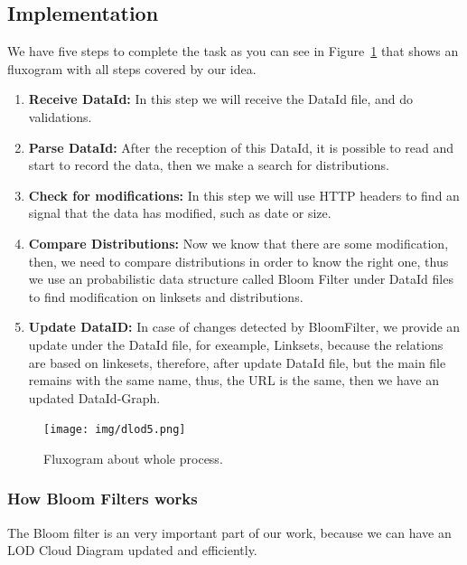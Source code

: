 \documentclass{iosart2c}
\begin{document}
\subsection{Implementation}
We have five steps to complete the task as you can see in Figure~\ref{fig:idea2} that shows an fluxogram with all steps covered by our idea.

\begin{enumerate}
\item \textbf{Receive DataId:} In this step we will receive the DataId file, and do validations.
\item \textbf{Parse DataId:} After the reception of this DataId, it is possible to read and start to record the data, then we make a search for distributions.
\item \textbf{Check for modifications:} In this step we will use HTTP headers to find an signal that the data has modified, such as date or size.
\item \textbf{Compare Distributions:} Now we know that there are some modification, then, we need to compare distributions in order to know the right one, thus we use an probabilistic data structure called Bloom Filter \cite{bloomfilter} under DataId files to find modification on linksets and distributions.
\item \textbf{Update DataID:} In case of changes detected by BloomFilter, we provide an update under the DataId file, for exeample, Linksets, because the relations are based on linkesets, therefore, after update DataId file, but the main file remains with the same name, thus, the URL is the same, then we have an updated DataId-Graph.
\end{enumerate}

\begin{figure}
  \centering
  \texttt{[image: img/dlod5.png]}
  \caption{Fluxogram about whole process.}
  \label{fig:idea2}
\end{figure}

\subsubsection{How Bloom Filters works}
The Bloom filter is an very important part of our work, because we can have an LOD Cloud Diagram updated and efficiently.
\end{document}
